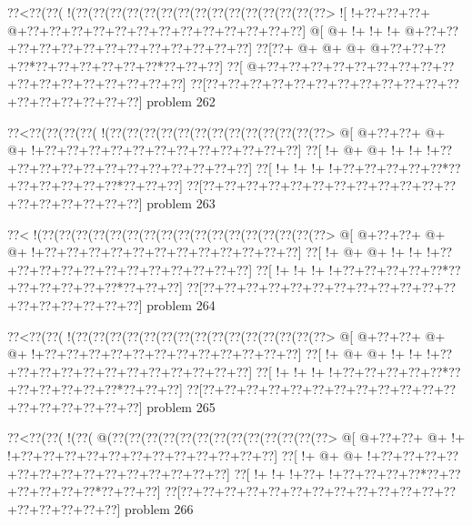 \vbox{\vbox{\goo
\0??<\0??(\0??(\- !(\0??(\0??(\0??(\0??(\0??(\0??(\0??(\0??(\0??(\0??(\0??(\0??(\0??(\0??(\0??>
\- ![\- !+\0??+\0??+\0??+\- @+\0??+\0??+\0??+\0??+\0??+\0??+\0??+\0??+\0??+\0??+\0??+\0??+\0??]
\- @[\- @+\- !+\- !+\- !+\- @+\0??+\0??+\0??+\0??+\0??+\0??+\0??+\0??+\0??+\0??+\0??+\0??+\0??]
\0??[\0??+\- @+\- @+\- @+\- @+\0??+\0??+\0??+\0??*\0??+\0??+\0??+\0??+\0??+\0??*\0??+\0??+\0??]
\0??[\- @+\0??+\0??+\0??+\0??+\0??+\0??+\0??+\0??+\0??+\0??+\0??+\0??+\0??+\0??+\0??+\0??+\0??]
\0??[\0??+\0??+\0??+\0??+\0??+\0??+\0??+\0??+\0??+\0??+\0??+\0??+\0??+\0??+\0??+\0??+\0??+\0??]
}
\hfil problem 262\hfil\break
}



\vbox{\vbox{\goo
\0??<\0??(\0??(\0??(\0??(\- !(\0??(\0??(\0??(\0??(\0??(\0??(\0??(\0??(\0??(\0??(\0??(\0??(\0??>
\- @[\- @+\0??+\0??+\- @+\- @+\- !+\0??+\0??+\0??+\0??+\0??+\0??+\0??+\0??+\0??+\0??+\0??+\0??]
\0??[\- !+\- @+\- @+\- !+\- !+\- !+\0??+\0??+\0??+\0??+\0??+\0??+\0??+\0??+\0??+\0??+\0??+\0??]
\0??[\- !+\- !+\- !+\- !+\0??+\0??+\0??+\0??+\0??*\0??+\0??+\0??+\0??+\0??+\0??*\0??+\0??+\0??]
\0??[\0??+\0??+\0??+\0??+\0??+\0??+\0??+\0??+\0??+\0??+\0??+\0??+\0??+\0??+\0??+\0??+\0??+\0??]
}
\hfil problem 263\hfil\break
}



\vbox{\vbox{\goo
\0??<\- !(\0??(\0??(\0??(\0??(\0??(\0??(\0??(\0??(\0??(\0??(\0??(\0??(\0??(\0??(\0??(\0??(\0??>
\- @[\- @+\0??+\0??+\- @+\- @+\- !+\0??+\0??+\0??+\0??+\0??+\0??+\0??+\0??+\0??+\0??+\0??+\0??]
\0??[\- !+\- @+\- @+\- !+\- !+\- !+\0??+\0??+\0??+\0??+\0??+\0??+\0??+\0??+\0??+\0??+\0??+\0??]
\0??[\- !+\- !+\- !+\- !+\0??+\0??+\0??+\0??+\0??*\0??+\0??+\0??+\0??+\0??+\0??*\0??+\0??+\0??]
\0??[\0??+\0??+\0??+\0??+\0??+\0??+\0??+\0??+\0??+\0??+\0??+\0??+\0??+\0??+\0??+\0??+\0??+\0??]
}
\hfil problem 264\hfil\break
}



\vbox{\vbox{\goo
\0??<\0??(\0??(\- !(\0??(\0??(\0??(\0??(\0??(\0??(\0??(\0??(\0??(\0??(\0??(\0??(\0??(\0??(\0??>
\- @[\- @+\0??+\0??+\- @+\- @+\- !+\0??+\0??+\0??+\0??+\0??+\0??+\0??+\0??+\0??+\0??+\0??+\0??]
\0??[\- !+\- @+\- @+\- !+\- !+\- !+\0??+\0??+\0??+\0??+\0??+\0??+\0??+\0??+\0??+\0??+\0??+\0??]
\0??[\- !+\- !+\- !+\- !+\0??+\0??+\0??+\0??+\0??*\0??+\0??+\0??+\0??+\0??+\0??*\0??+\0??+\0??]
\0??[\0??+\0??+\0??+\0??+\0??+\0??+\0??+\0??+\0??+\0??+\0??+\0??+\0??+\0??+\0??+\0??+\0??+\0??]
}
\hfil problem 265\hfil\break
}



\vbox{\vbox{\goo
\0??<\0??(\0??(\- !(\0??(\- @(\0??(\0??(\0??(\0??(\0??(\0??(\0??(\0??(\0??(\0??(\0??(\0??(\0??>
\- @[\- @+\0??+\0??+\- @+\- !+\- !+\0??+\0??+\0??+\0??+\0??+\0??+\0??+\0??+\0??+\0??+\0??+\0??]
\0??[\- !+\- @+\- @+\- !+\0??+\0??+\0??+\0??+\0??+\0??+\0??+\0??+\0??+\0??+\0??+\0??+\0??+\0??]
\0??[\- !+\- !+\- !+\0??+\- !+\0??+\0??+\0??+\0??*\0??+\0??+\0??+\0??+\0??+\0??*\0??+\0??+\0??]
\0??[\0??+\0??+\0??+\0??+\0??+\0??+\0??+\0??+\0??+\0??+\0??+\0??+\0??+\0??+\0??+\0??+\0??+\0??]
}
\hfil problem 266\hfil\break
}



